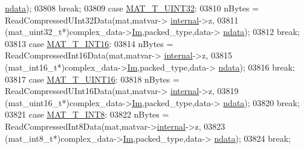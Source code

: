 \begin{DoxyCode}
{{{{{{{{{{{{{{{{{{      \hyperlink{group___m_a_t_a1beb8a8c58a808207cbea650563a9b63}{ndata});
03808                             \textcolor{keywordflow}{break};
03809                         \textcolor{keywordflow}{case} \hyperlink{group___m_a_t_ggacf7b3b879282b7ab3a51190e49bf3453aa397e285a23fe240368b752897652c6a}{MAT\_T\_UINT32}:
03810                             nBytes = ReadCompressedUInt32Data(mat,matvar->
      \hyperlink{group___m_a_t_a6e97e3ed9f40c49322c18561c2a94e92}{internal}->z,
03811                                  (mat\_uint32\_t*)complex\_data->\hyperlink{group___m_a_t_a7182d10b0d3598415887376065440946}{Im},packed\_type,data->
      \hyperlink{group___m_a_t_a1beb8a8c58a808207cbea650563a9b63}{ndata});
03812                             \textcolor{keywordflow}{break};
03813                         \textcolor{keywordflow}{case} \hyperlink{group___m_a_t_ggacf7b3b879282b7ab3a51190e49bf3453a8c5b2e381946e95ea8d81ac216743302}{MAT\_T\_INT16}:
03814                             nBytes = ReadCompressedInt16Data(mat,matvar->
      \hyperlink{group___m_a_t_a6e97e3ed9f40c49322c18561c2a94e92}{internal}->z,
03815                                  (mat\_int16\_t*)complex\_data->\hyperlink{group___m_a_t_a7182d10b0d3598415887376065440946}{Im},packed\_type,data->
      \hyperlink{group___m_a_t_a1beb8a8c58a808207cbea650563a9b63}{ndata});
03816                             \textcolor{keywordflow}{break};
03817                         \textcolor{keywordflow}{case} \hyperlink{group___m_a_t_ggacf7b3b879282b7ab3a51190e49bf3453a05bc7af7680aa68be95126ae0a4c2e31}{MAT\_T\_UINT16}:
03818                             nBytes = ReadCompressedUInt16Data(mat,matvar->
      \hyperlink{group___m_a_t_a6e97e3ed9f40c49322c18561c2a94e92}{internal}->z,
03819                                  (mat\_uint16\_t*)complex\_data->\hyperlink{group___m_a_t_a7182d10b0d3598415887376065440946}{Im},packed\_type,data->
      \hyperlink{group___m_a_t_a1beb8a8c58a808207cbea650563a9b63}{ndata});
03820                             \textcolor{keywordflow}{break};
03821                         \textcolor{keywordflow}{case} \hyperlink{group___m_a_t_ggacf7b3b879282b7ab3a51190e49bf3453a9807f5033ed4f9b548953742d9fd1658}{MAT\_T\_INT8}:
03822                             nBytes = ReadCompressedInt8Data(mat,matvar->\hyperlink{group___m_a_t_a6e97e3ed9f40c49322c18561c2a94e92}{internal}->z,
03823                                  (mat\_int8\_t*)complex\_data->\hyperlink{group___m_a_t_a7182d10b0d3598415887376065440946}{Im},packed\_type,data->
      \hyperlink{group___m_a_t_a1beb8a8c58a808207cbea650563a9b63}{ndata});
03824                             \textcolor{keywordflow}{break};
}}}}}}}}}}}}}}}}}}
\end{DoxyCode}
